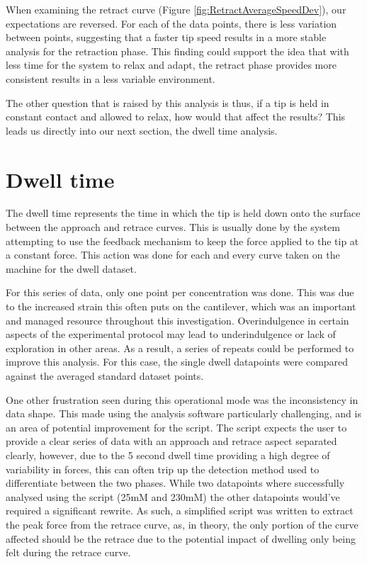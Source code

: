 When examining the retract curve (Figure \ref{fig:RetractAverageSpeedDev}), our expectations are reversed. For each of the data points, there is less variation between points, suggesting that a faster tip speed results in a more stable analysis for the retraction phase. This finding could support the idea that with less time for the system to relax and adapt, the retract phase provides more consistent results in a less variable environment.

The other question that is raised by this analysis is thus, if a tip is held in constant contact and allowed to relax, how would that affect the results? This leads us directly into our next section, the dwell time analysis.

\section{Dwell time}

The dwell time represents the time in which the tip is held down onto the surface between the approach and retrace curves. This is usually done by the system attempting to use the feedback mechanism to keep the force applied to the tip at a constant force. This action was done for each and every curve taken on the machine for the dwell dataset.

For this series of data, only one point per concentration was done. This was due to the increased strain this often puts on the cantilever, which was an important and managed resource throughout this investigation. Overindulgence in certain aspects of the experimental protocol may lead to underindulgence or lack of exploration in other areas. As a result, a series of repeats could be performed to improve this analysis. For this case, the single dwell datapoints were compared against the averaged standard dataset points.

One other frustration seen during this operational mode was the inconsistency in data shape. This made using the analysis software particularly challenging, and is an area of potential improvement for the script. The script expects the user to provide a clear series of data with an approach and retrace aspect separated clearly, however, due to the 5 second dwell time providing a high degree of variability in forces, this can often trip up the detection method used to differentiate between the two phases. While two datapoints where successfully analysed using the script (25mM and 230mM) the other datapoints would've required a significant rewrite. As such, a simplified script was written to extract the peak force from the retrace curve, as, in theory, the only portion of the curve affected should be the retrace due to the potential impact of dwelling only being felt during the retrace curve.

